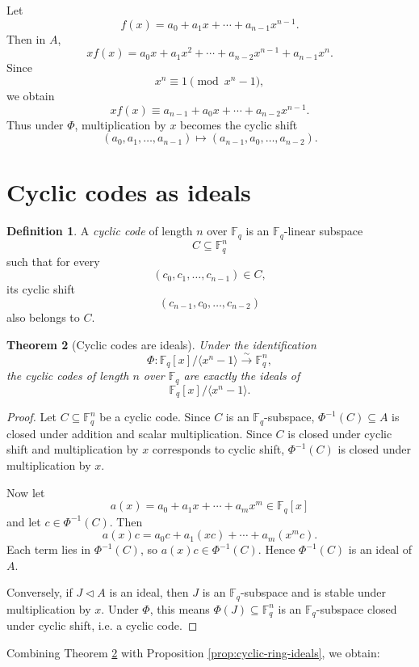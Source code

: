 \documentclass[11pt]{article}
\newtheorem{theorem}{Theorem}[section]
\theoremstyle{definition}
\newtheorem{definition}[theorem]{Definition}
\newcommand{\F}{\mathbb{F}}
\newcommand{\ideal}[1]{\langle #1\rangle}
\begin{document}
	Let
	\[
	f(x)=a_0+a_1x+\cdots+a_{n-1}x^{n-1}.
	\]
	Then in \(A\),
	\[
	x f(x)
	=
	a_0x+a_1x^2+\cdots+a_{n-2}x^{n-1}+a_{n-1}x^n.
	\]
	Since
	\[
	x^n\equiv 1\pmod{x^n-1},
	\]
	we obtain
	\[
	x f(x)\equiv a_{n-1}+a_0x+\cdots+a_{n-2}x^{n-1}.
	\]
	Thus under \(\Phi\), multiplication by \(x\) becomes the cyclic shift
	\[
	(a_0,a_1,\dots,a_{n-1})
	\longmapsto
	(a_{n-1},a_0,\dots,a_{n-2}).
	\]
	
	\section{Cyclic codes as ideals}
	
	\begin{definition}
		A \emph{cyclic code} of length \(n\) over \(\F_q\) is an \(\F_q\)-linear subspace
		\[
		C\subseteq \F_q^n
		\]
		such that for every
		\[
		(c_0,c_1,\dots,c_{n-1})\in C,
		\]
		its cyclic shift
		\[
		(c_{n-1},c_0,\dots,c_{n-2})
		\]
		also belongs to \(C\).
	\end{definition}
	
	\begin{theorem}[Cyclic codes are ideals]\label{thm:cyclic-codes-ideals}
		Under the identification
		\[
		\Phi:\F_q[x]/\ideal{x^n-1}\xrightarrow{\sim}\F_q^n,
		\]
		the cyclic codes of length \(n\) over \(\F_q\) are exactly the ideals of
		\[
		\F_q[x]/\ideal{x^n-1}.
		\]
	\end{theorem}
	
	\begin{proof}
		Let \(C\subseteq \F_q^n\) be a cyclic code. Since \(C\) is an \(\F_q\)-subspace, \(\Phi^{-1}(C)\subseteq A\) is closed under addition and scalar multiplication. Since \(C\) is closed under cyclic shift and multiplication by \(x\) corresponds to cyclic shift, \(\Phi^{-1}(C)\) is closed under multiplication by \(x\).
		
		Now let
		\[
		a(x)=a_0+a_1x+\cdots+a_mx^m\in \F_q[x]
		\]
		and let \(c\in \Phi^{-1}(C)\). Then
		\[
		a(x)c
		=
		a_0c+a_1(xc)+\cdots+a_m(x^m c).
		\]
		Each term lies in \(\Phi^{-1}(C)\), so \(a(x)c\in \Phi^{-1}(C)\). Hence \(\Phi^{-1}(C)\) is an ideal of \(A\).
		
		Conversely, if \(J\triangleleft A\) is an ideal, then \(J\) is an \(\F_q\)-subspace and is stable under multiplication by \(x\). Under \(\Phi\), this means \(\Phi(J)\subseteq \F_q^n\) is an \(\F_q\)-subspace closed under cyclic shift, i.e. a cyclic code.
	\end{proof}
	
	Combining Theorem \ref{thm:cyclic-codes-ideals} with Proposition \ref{prop:cyclic-ring-ideals}, we obtain:
	
\end{document}
